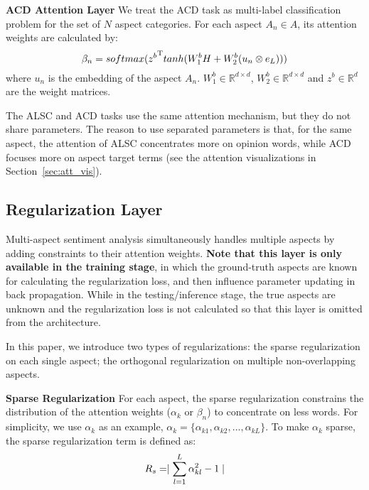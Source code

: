 \documentclass[11pt,a4paper]{article}
\begin{document}
{\bf ACD Attention Layer} We treat the ACD task as multi-label classification problem for the set of $N$ aspect categories. For each aspect $A_n\in A$, its attention weights are calculated by:
\begin{equation} 
\setlength{\abovedisplayskip}{4pt}  %
\setlength{\belowdisplayskip}{4pt}  %
    \beta_n = softmax({z^b}^\mathrm{T}tanh(W_{1}^{b}{H} + W_{2}^{b}(u_n\otimes{e_L}))) 
  \label{equation_acd_att}
\end{equation}
where $u_n$ is the embedding of the aspect $A_n$. $W_{1}^b\in\mathbb{R}^{{d}\times{d}}$, $W_{2}^b\in\mathbb{R}^{{d}\times{d}}$ and $z^b\in\mathbb{R}^{d}$ are the weight matrices.

The ALSC and ACD tasks use the same attention mechanism, but they do not share parameters. The reason to use separated parameters is that, for the same aspect, the attention of ALSC concentrates more on opinion words, while ACD focuses more on aspect target terms (see the attention visualizations in Section~\ref{sec:att_vis}). 

\subsection{Regularization Layer}
Multi-aspect sentiment analysis simultaneously handles multiple aspects by adding constraints to their attention weights. {\bf Note that this layer is only available in the training stage}, in which the ground-truth aspects are known for calculating the regularization loss, and then influence parameter updating in back propagation. While in the testing/inference stage, the true aspects are unknown and the regularization loss is not calculated so that this layer is omitted from the architecture.  

In this paper, we introduce two types of regularizations: the sparse regularization on each single aspect; the orthogonal regularization on multiple non-overlapping aspects. 

{\bf Sparse Regularization} For each aspect, the sparse regularization constrains the distribution of the attention weights ($\alpha_k$ or $\beta_n$) to concentrate on less words. For simplicity, we use $\alpha_k$ as an example, $\alpha_k=\{\alpha_{k1},  \alpha_{k2}, ..., \alpha_{kL}\}$. To make $\alpha_k$ sparse, the sparse regularization term is defined as: 
\begin{equation} 
\setlength{\abovedisplayskip}{4pt}  %
\setlength{\belowdisplayskip}{4pt}  %
    R_s = \mid\sum\limits_{l=1}^L{\alpha_{kl}^{2}} - 1\mid
    \label{equation:sparse_reg}
\end{equation}
\end{document}
